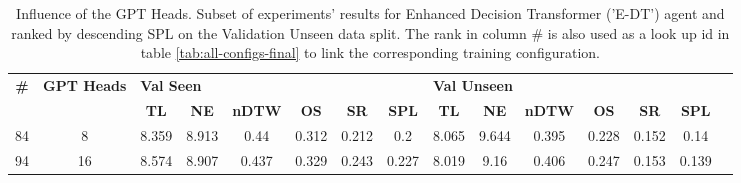 \begin{table}
\centering
\caption{\label{tab:e_dt_heads}Influence of the GPT Heads. Subset of experiments' results for Enhanced Decision Transformer ('E-DT') agent and ranked by descending SPL on the Validation Unseen data split. The rank in column \# is also used as a look up id in table \ref{tab:all-configs-final} to link the corresponding training configuration.}
\begin{tabular}{@{\hskip3pt}c@{\hskip3pt}c@{\hskip3pt}c@{\hskip3pt}c@{\hskip3pt}c@{\hskip3pt}c@{\hskip3pt}c@{\hskip3pt}c@{\hskip3pt}c@{\hskip3pt}c@{\hskip3pt}c@{\hskip3pt}c@{\hskip3pt}c@{\hskip3pt}c@{\hskip3pt}c}
\toprule
\textbf{\#} & \textbf{GPT Heads} & \multicolumn{6}{l}{\textbf{Val Seen}} & \multicolumn{6}{l}{\textbf{Val Unseen}} \\
 \textbf{~} &         \textbf{~} &       \textbf{TL} & \textbf{NE} & \textbf{nDTW} & \textbf{OS} & \textbf{SR} & \textbf{SPL} &         \textbf{TL} & \textbf{NE} & \textbf{nDTW} & \textbf{OS} & \textbf{SR} & \textbf{SPL} \\
\midrule
         84 &                  8 &             8.359 &       8.913 &          0.44 &       0.312 &       0.212 &          0.2 &               8.065 &       9.644 &         0.395 &       0.228 &       0.152 &         0.14 \\
         94 &                 16 &             8.574 &       8.907 &         0.437 &       0.329 &       0.243 &        0.227 &               8.019 &        9.16 &         0.406 &       0.247 &       0.153 &        0.139 \\
\bottomrule
\end{tabular}
\end{table}
